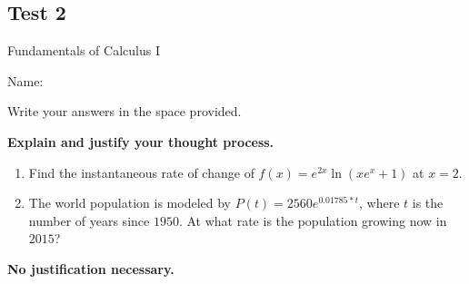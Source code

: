 \documentclass[a4paper, 12pt]{article}
\title{}
\date{}
\newcommand{\bt}[1]{\textbf{#1}} %
\begin{document}
\begin{center}
\section*{Test 2}
Fundamentals of Calculus I\\
\end{center}
Name: \\
\vspace{1cm}



Write your answers in the space provided.

\bt{Explain and justify your thought process.}


    \begin{enumerate}
        \item Find the instantaneous rate of change of $f(x) = e^{2x}\ln(xe^x + 1)$ at 
        $x = 2$.
       
        \vspace{8cm}

        \item The world population is modeled by $P(t) = 2560 e^{0.01785* t}$, where
        $t$ is the number of years since $1950$. 
        At what rate is the population growing now in $2015$?
        \vspace{8cm}
    \end{enumerate}

\newpage

\bt{No justification necessary.}
\end{document}
